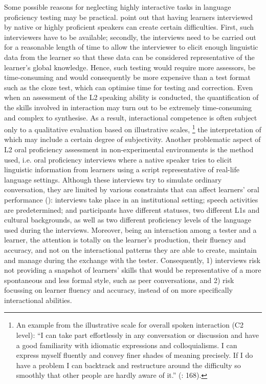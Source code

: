Some possible reasons for neglecting highly interactive tasks in language proficiency testing may be practical. \citet{HeYoung1998} point out that having learners interviewed by native or highly proficient speakers can create certain difficulties. First, such interviewers have to be available; secondly, the interviews need to be carried out for a reasonable length of time to allow the interviewer to elicit enough linguistic data from the learner so that these data can be considered representative of the learner’s global knowledge. Hence, such testing would require more assessors, be time-consuming and would consequently be more expensive than a test format such as the cloze test, which can optimise time for testing and correction. Even when an assessment of the L2 speaking ability is conducted, the quantification of the skills involved in interaction may turn out to be extremely time-consuming and complex to synthesise. As a result, interactional competence is often subject only to a qualitative evaluation based on illustrative scales, \footnote{An example from the illustrative scale for overall spoken interaction (C2 level): “I can take part effortlessly in any conversation or discussion and have a good familiarity with idiomatic expressions and colloquialisms. I can express myself fluently and convey finer shades of meaning precisely. If I do have a problem I can backtrack and restructure around the difficulty so smoothly that other people are hardly aware of it.” (\citealt{GoodierNorth2018}: 168).} the interpretation of which may include a certain degree of subjectivity. Another problematic aspect of L2 oral proficiency assessment in non-experimental environments is the method used, i.e. oral proficiency interviews where a native speaker tries to elicit linguistic information from learners using a script representative of real-life language settings. Although these interviews try to simulate ordinary conversation, they are limited by various constraints that can affect learners’ oral performance (\citealt{HeYoung1998}): interviews take place in an institutional setting; speech activities are predetermined; and participants have different statuses, two different L1s and cultural backgrounds, as well as two different proficiency levels of the language used during the interviews. Moreover, being an interaction among a tester and a learner, the attention is totally on the learner’s production, their fluency and accuracy, and not on the interactional patterns they are able to create, maintain and manage during the exchange with the tester. Consequently, 1) interviews risk not providing a snapshot of learners’ skills that would be representative of a more spontaneous and less formal style, such as peer conversations, and 2) risk focussing on learner fluency and accuracy, instead of on more specifically interactional abilities.


